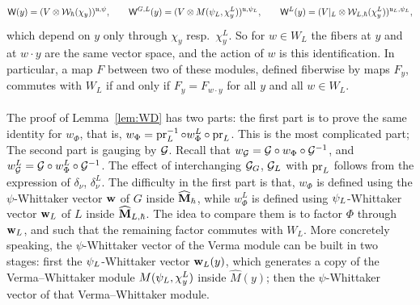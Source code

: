 \documentclass{article}
\theoremstyle{plain}
\theoremstyle{definition}
\theoremstyle{remark}
\numberwithin{equation}{section}
\begin{document}
\[
\mathsf W(y)=(V\otimes\mathcal{W}_\hbar(\chi_y))^{\mathfrak{u},\psi},\qquad \mathsf W^{G,L}(y)=(V\otimes M(\psi_L,\chi^L_y))^{\mathfrak{u},\psi_L},\qquad \mathsf W^L(y)=(V|_L\otimes\mathcal{W}_{L,\hbar}(\chi^L_y))^{\mathfrak{u}_L,\psi_L},
\]
which depend on $y$ only through $\chi_y$ resp.\ $\chi^L_y$. So for $w\in W_L$ the fibers at $y$ and at $w\cdot y$ are the same vector space, and the action of $w$ is this identification. In particular, a map $F$ between two of these modules, defined fiberwise by maps $F_y$, commutes with $W_L$ if and only if $F_y=F_{w\cdot y}$ for all $y$ and all $w\in W_L$.
\\ \hspace{\fill} \\
The proof of Lemma~\ref{lem:WD} has two parts: the first part is to prove the same identity for $w_\Phi$, that is, $w_\Phi = \operatorname{pr}_L^{-1}\circ w_\Phi^{L} \circ \operatorname{pr}_L$. This is the most complicated part; The second part is gauging by $\mathcal G$. Recall that $w_\mathcal G = \mathcal G \circ w_\Phi \circ \mathcal G^{-1}$, and $w_\mathcal G^L = \mathcal G \circ w_\Phi^L \circ \mathcal G^{-1}$. The effect of interchanging $\mathcal G_G$, $\mathcal G_L$ with $\operatorname{pr}_L$ follows from the expression of $\delta_\nu$, $\delta_\nu^L$. The difficulty in the first part is that, $w_\Phi$ is defined using the $\psi$-Whittaker vector $\mathbf w$ of $G$ inside $\widehat{\mathbf{M}}_\hbar$, while $w_\Phi^L$ is defined using $\psi_L$-Whittaker vector $\mathbf w_L$ of $L$ inside $\widehat{\mathbf{M}}_{L,\hbar}$. The idea to compare them is to factor $\Phi$ through $\mathbf w_L$, and such that the remaining factor commutes with $W_L$. More concretely speaking, the $\psi$-Whittaker vector of the Verma module can be built in two stages: first the $\psi_L$-Whittaker vector $\mathbf w_L(y)$, which generates a copy of the Verma--Whittaker module $M(\psi_L,\chi^L_y)$ inside $\widehat M(y)$; then the $\psi$-Whittaker vector of that Verma--Whittaker module.
\end{document}
